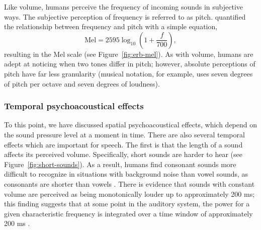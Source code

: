 
Like volume,
humans perceive
the frequency of incoming sounds
in subjective ways.
The subjective perception of frequency
is referred to as pitch.
\citet{stevens1937} quantified
the relationship between
frequency and pitch
with a simple equation,
\begin{equation}
  \text{Mel} = 2595 \log_{10} \left(1 + \frac{f}{700}\right),
\end{equation}
resulting in the Mel scale
(see Figure~\ref{fig:erb-mel}).
As with volume, humans are adept at
noticing when two tones differ in pitch;
however, absolute perceptions of pitch
have far less granularity
(musical notation, for example,
uses seven degrees of pitch per octave
and seven degrees of loudness).

\subsubsection{Temporal psychoacoustical effects}

To this point, we have discussed
spatial psychoacoustical effects,
which depend on
the sound pressure level
at a moment in time.
There are also several temporal effects
which are important for speech.
The first is that the length
of a sound affects its perceived volume.
Specifically, short sounds are harder to hear
(see Figure~\ref{fig:short-sounds}).
As a result, humans find
consonant sounds more difficult
to recognize in situations with background noise
than vowel sounds,
as consonants are shorter than vowels
\citep[Chapter~3]{everest2001}.
There is evidence that sounds with constant volume
are perceived as being monotonically louder
up to approximately 200 ms;
this finding suggests that
at some point in the auditory system,
the power for a given characteristic frequency
is integrated over a time window
of approximately 200 ms
\citep[p.64]{kollmeier2008}.


